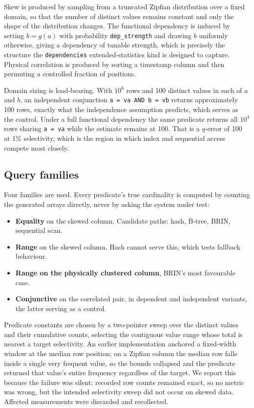 \documentclass[preprint,12pt,authoryear]{elsarticle}
\begin{document}
Skew is produced by sampling from a truncated Zipfian distribution over
a fixed domain, so that the number of distinct values remains constant
and only the shape of the distribution changes. The functional
dependency is induced by setting $b = g(a)$ with probability
\texttt{dep\_strength} and drawing $b$ uniformly otherwise, giving a
dependency of tunable strength, which is precisely the structure the
\texttt{dependencies} extended-statistics kind is designed to capture.
Physical correlation is produced by sorting a timestamp column and then
permuting a controlled fraction of positions.

Domain sizing is load-bearing. With $10^6$ rows and 100 distinct values
in each of $a$ and $b$, an independent conjunction
\texttt{a = va AND b = vb} returns approximately 100 rows, exactly what
the independence assumption predicts, which serves as the control.
Under a full functional dependency the same predicate returns all
$10^4$ rows sharing \texttt{a = va} while the estimate remains at 100.
That is a $q$-error of 100 at 1\% selectivity, which is the region in
which index and sequential access compete most closely.

\subsection{Query families}

Four families are used. Every predicate's true cardinality is computed
by counting the generated arrays directly, never by asking the system
under test:

\begin{itemize}
\item \textbf{Equality} on the skewed column. Candidate paths: hash,
  B-tree, BRIN, sequential scan.
\item \textbf{Range} on the skewed column. Hash cannot serve this,
  which tests fallback behaviour.
\item \textbf{Range on the physically clustered column}, BRIN's most
  favourable case.
\item \textbf{Conjunctive} on the correlated pair, in dependent and
  independent variants, the latter serving as a control.
\end{itemize}

Predicate constants are chosen by a two-pointer sweep over the
distinct values and their cumulative counts, selecting the contiguous
value range whose total is nearest a target selectivity. An earlier
implementation anchored a fixed-width window at the median row
position; on a Zipfian column the median row falls inside a single very
frequent value, so the bounds collapsed and the predicate returned that
value's entire frequency regardless of the target. We report this
because the failure was silent: recorded row counts remained exact, so
no metric was wrong, but the intended selectivity sweep did not occur
on skewed data. Affected measurements were discarded and recollected.
\end{document}
